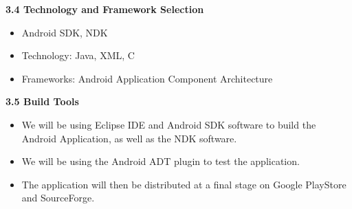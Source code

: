 \documentclass[29pt,a4paper]{moderncv}
\begin{document}
		\vspace{5mm}
\newpage		
		\noindent \textbf{3.4 Technology and Framework Selection}
			\begin{itemize}
				\item Android SDK, NDK
				\item Technology: Java, XML, C
				\item Frameworks: Android Application Component Architecture
			\end{itemize}
		\vspace{5mm}
		
		\noindent \textbf{3.5 Build Tools}
			\begin{itemize}
				\item We will be using Eclipse IDE and Android SDK software to build the Android Application, as well as the NDK software.
				\item We will be using the Android ADT plugin to test the application. 
				\item The application will then be distributed at a final stage on Google PlayStore and SourceForge.
				
			\end{itemize}
		\vspace{5mm}
	\vspace{5mm}	
\newpage
\end{document}

